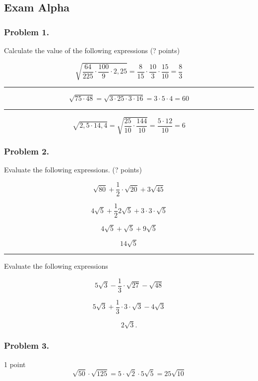 \documentclass{article}
\begin{document}
\subsection{Exam Alpha}
\subsubsection{Problem 1.}

Calculate the value of the following expressions (? points)

\[
\sqrt{\frac{64}{225} \cdot \frac{100}{9} \cdot 2,25} = \frac{8}{15} \cdot \frac{10}{3} \cdot \frac{15}{10} = \frac{8}{3}
\]

\vspace{3pt}
\hrule
\vspace{8pt}

\[
\sqrt{75 \cdot 48} = \sqrt{3 \cdot 25 \cdot 3 \cdot 16} = 3 \cdot 5 \cdot 4 = 60
\]

\vspace{3pt}
\hrule
\vspace{8pt}

\[
\sqrt{2,5 \cdot 14,4} = \sqrt{\frac{25}{10} \cdot \frac{144}{10}} = \frac{5 \cdot 12}{10} = 6
\]

\subsubsection{Problem 2.}
Evaluate the following expressions. (? points)

\[
\sqrt{80} + \frac{1}{2}\cdot\sqrt{20} + 3\sqrt{45} 
\]

\[
4\sqrt{5} + \frac{1}{2}2\sqrt{5} + 3\cdot 3\cdot\sqrt{5}
\]

\[
4\sqrt{5} + \sqrt{5} + 9\sqrt{5}
\]

\[
14\sqrt{5}
\]

\vspace{3pt}
\hrule
\vspace{8pt}
Evaluate the following expressions

\[
5\sqrt{3} - \frac{1}{3} \cdot \sqrt{27} - \sqrt{48}
\]

\[
5\sqrt{3} + \frac{1}{3} \cdot 3 \cdot \sqrt{3} - 4\sqrt{3}
\]

\[
2\sqrt{3}.
\]

\subsubsection{Problem 3.}
1 point
\[
\sqrt{50} \cdot \sqrt{125} = 5\cdot\sqrt{2} \cdot 5 \sqrt{5} = 25\sqrt{10}
\]
\end{document}
